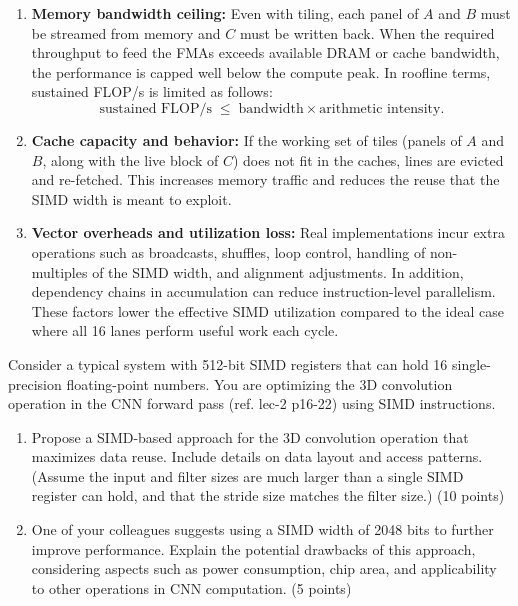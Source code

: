 \documentclass[a4 paper]{article}
\begin{document}
\begin{enumerate}
    \item \textbf{Memory bandwidth ceiling:} Even with tiling, each panel of $A$ and $B$ must be streamed from memory and $C$ must be written back. When the required throughput to feed the FMAs exceeds available DRAM or cache bandwidth, the performance is capped well below the compute peak. In roofline terms, sustained FLOP/s is limited as follows:
    \[
      \text{sustained FLOP/s} \;\leq\; \text{bandwidth} \times \text{arithmetic intensity}.
    \]
    \item \textbf{Cache capacity and behavior:} If the working set of tiles (panels of $A$ and $B$, along with the live block of $C$) does not fit in the caches, lines are evicted and re-fetched. This increases memory traffic and reduces the reuse that the SIMD width is meant to exploit.
    \item \textbf{Vector overheads and utilization loss:} Real implementations incur extra operations such as broadcasts, shuffles, loop control, handling of non-multiples of the SIMD width, and alignment adjustments. In addition, dependency chains in accumulation can reduce instruction-level parallelism. These factors lower the effective SIMD utilization compared to the ideal case where all 16 lanes perform useful work each cycle.
\end{enumerate}



Consider a typical system with 512-bit SIMD registers that can hold 16 single-precision floating-point numbers. You are optimizing the 3D convolution operation in the CNN forward pass (ref. lec-2 p16-22) using SIMD instructions.

\begin{enumerate}
    \item Propose a SIMD-based approach for the 3D convolution operation that maximizes data reuse. Include details on data layout and access patterns. (Assume the input and filter sizes are much larger than a single SIMD register can hold, and that the stride size matches the filter size.) (10 points)
    \item One of your colleagues suggests using a SIMD width of 2048 bits to further improve performance. Explain the potential drawbacks of this approach, considering aspects such as power consumption, chip area, and applicability to other operations in CNN computation. (5 points)
\end{enumerate}
\end{document}
